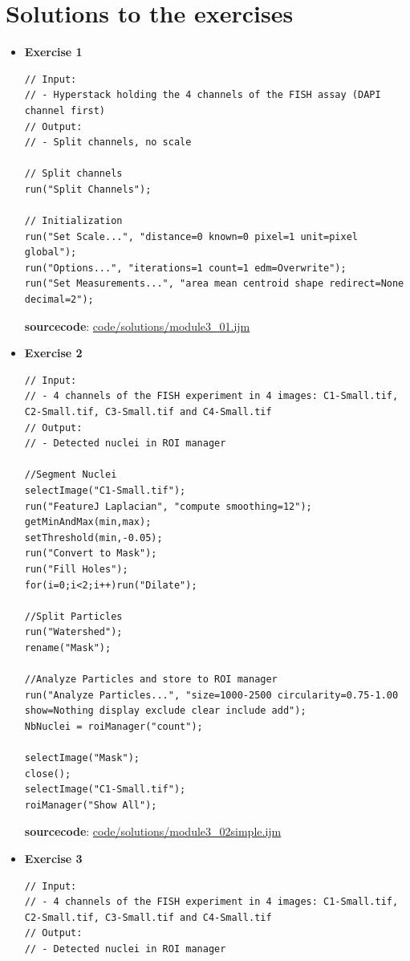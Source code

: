 \documentclass[11pt,a4paper,oneside]{report}
\begin{document}
\newpage
\section{Solutions to the exercises}
\begin{itemize}
\item \textbf{Exercise 1}

\begin{lstlisting}
// Input: 
// - Hyperstack holding the 4 channels of the FISH assay (DAPI channel first)
// Output: 
// - Split channels, no scale

// Split channels
run("Split Channels");

// Initialization
run("Set Scale...", "distance=0 known=0 pixel=1 unit=pixel global");
run("Options...", "iterations=1 count=1 edm=Overwrite");
run("Set Measurements...", "area mean centroid shape redirect=None decimal=2");
\end{lstlisting}
\textbf{sourcecode}: \href{http://www.example.com/contents}{code/solutions/module3\_01.ijm}
\item \textbf{Exercise 2}

\begin{lstlisting}
// Input: 
// - 4 channels of the FISH experiment in 4 images: C1-Small.tif, C2-Small.tif, C3-Small.tif and C4-Small.tif
// Output: 
// - Detected nuclei in ROI manager

//Segment Nuclei
selectImage("C1-Small.tif");
run("FeatureJ Laplacian", "compute smoothing=12");
getMinAndMax(min,max);
setThreshold(min,-0.05);
run("Convert to Mask");
run("Fill Holes");
for(i=0;i<2;i++)run("Dilate");

//Split Particles
run("Watershed");
rename("Mask");

//Analyze Particles and store to ROI manager
run("Analyze Particles...", "size=1000-2500 circularity=0.75-1.00 show=Nothing display exclude clear include add");
NbNuclei = roiManager("count");

selectImage("Mask");
close();
selectImage("C1-Small.tif");
roiManager("Show All");
\end{lstlisting}
\textbf{sourcecode}: \href{http://www.example.com/contents}{code/solutions/module3\_02simple.ijm}
\item \textbf{Exercise 3}

\begin{lstlisting}
// Input: 
// - 4 channels of the FISH experiment in 4 images: C1-Small.tif, C2-Small.tif, C3-Small.tif and C4-Small.tif
// Output: 
// - Detected nuclei in ROI manager


\end{lstlisting}
\end{itemize}
\end{document}
